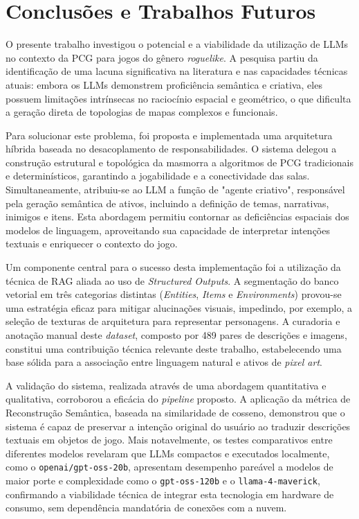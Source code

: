 \chapter{Conclusões e Trabalhos Futuros}
\label{chap:conclusoes-e-trabalhos-futuros}

O presente trabalho investigou o potencial e a viabilidade da utilização de
\gls{LLM}s no contexto da \gls{PCG} para jogos do gênero \textit{roguelike}. A
pesquisa partiu da identificação de uma lacuna significativa na literatura e nas
capacidades técnicas atuais: embora os \gls{LLM}s demonstrem proficiência
semântica e criativa, eles possuem limitações intrínsecas no raciocínio espacial
e geométrico, o que dificulta a geração direta de topologias de mapas complexos
e funcionais.

Para solucionar este problema, foi proposta e implementada uma arquitetura
híbrida baseada no desacoplamento de responsabilidades. O sistema delegou a
construção estrutural e topológica da masmorra a algoritmos de \gls{PCG}
tradicionais e determinísticos, garantindo a jogabilidade e a conectividade das
salas.  Simultaneamente, atribuiu-se ao \gls{LLM} a função de "agente criativo",
responsável pela geração semântica de ativos, incluindo a definição de temas,
narrativas, inimigos e itens. Esta abordagem permitiu contornar as deficiências
espaciais dos modelos de linguagem, aproveitando sua capacidade de interpretar
intenções textuais e enriquecer o contexto do jogo.

Um componente central para o sucesso desta implementação foi a utilização da
técnica de \gls{RAG} aliada ao uso de \textit{Structured Outputs}. A segmentação
do banco vetorial em três categorias distintas (\textit{Entities},
\textit{Items} e \textit{Environments}) provou-se uma estratégia eficaz para
mitigar alucinações visuais, impedindo, por exemplo, a seleção de texturas de
arquitetura para representar personagens. A curadoria e anotação manual deste
\textit{dataset}, composto por 489 pares de descrições e imagens, constitui uma
contribuição técnica relevante deste trabalho, estabelecendo uma base sólida
para a associação entre linguagem natural e ativos de \textit{pixel art}.

A validação do sistema, realizada através de uma abordagem quantitativa e
qualitativa, corroborou a eficácia do \textit{pipeline} proposto. A aplicação da
métrica de Reconstrução Semântica, baseada na similaridade de cosseno,
demonstrou que o sistema é capaz de preservar a intenção original do usuário ao
traduzir descrições textuais em objetos de jogo. Mais notavelmente, os testes
comparativos entre diferentes modelos revelaram que \gls{LLM}s compactos e
executados localmente, como o \texttt{openai/gpt-oss-20b}, apresentam desempenho
pareável a modelos de maior porte e complexidade como o \texttt{gpt-oss-120b} e
o \texttt{llama-4-maverick}, confirmando a viabilidade técnica de integrar esta
tecnologia em hardware de consumo, sem dependência mandatória de conexões com a
nuvem.

